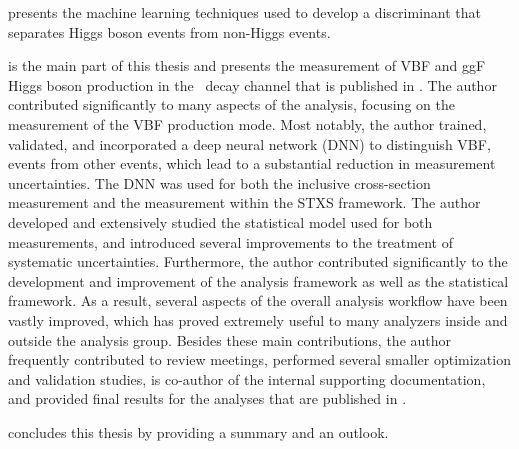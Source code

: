  presents the machine learning techniques used to develop a discriminant that separates Higgs boson events from non-Higgs events.

 is the main part of this thesis and presents the measurement of VBF and ggF Higgs boson production in the \HWW\ decay channel that is published in . The author contributed significantly to many aspects of the analysis, focusing on the measurement of the VBF production mode. 
Most notably, the author trained, validated, and incorporated a deep neural network (DNN) to distinguish VBF, \HWW events from other events, which lead to a substantial reduction in measurement uncertainties.
The DNN was used for both the inclusive cross-section measurement and the measurement within the STXS framework.
The author developed and extensively studied the statistical model used for both measurements, and introduced several improvements to the treatment of systematic uncertainties.
Furthermore, the author contributed significantly to the development and improvement of the analysis framework as well as the statistical framework. As a result, several aspects of the overall analysis workflow have been vastly improved, which has proved extremely useful to many analyzers inside and outside the \HWW analysis group.
Besides these main contributions, the author frequently contributed to review meetings, performed several smaller optimization and validation studies, is co-author of the internal supporting documentation, and provided final results for the analyses that are published in .

 concludes this thesis by providing a summary and an outlook.


